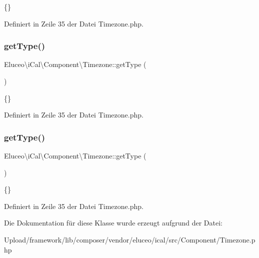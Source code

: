 \{\} 

Definiert in Zeile 35 der Datei Timezone.\+php.

\mbox{\label{class_eluceo_1_1i_cal_1_1_component_1_1_timezone_aa6dd55a9a67eec7d5a41ef9bfecda0fe}} 
\subsubsection{\texorpdfstring{get\+Type()}{getType()}\hspace{0.1cm}{\footnotesize\ttfamily [2/3]}}
{\footnotesize\ttfamily Eluceo\textbackslash{}i\+Cal\textbackslash{}\+Component\textbackslash{}\+Timezone\+::get\+Type (\begin{DoxyParamCaption}{ }\end{DoxyParamCaption})}

\{\} 

Definiert in Zeile 35 der Datei Timezone.\+php.

\mbox{\label{class_eluceo_1_1i_cal_1_1_component_1_1_timezone_aa6dd55a9a67eec7d5a41ef9bfecda0fe}} 
\subsubsection{\texorpdfstring{get\+Type()}{getType()}\hspace{0.1cm}{\footnotesize\ttfamily [3/3]}}
{\footnotesize\ttfamily Eluceo\textbackslash{}i\+Cal\textbackslash{}\+Component\textbackslash{}\+Timezone\+::get\+Type (\begin{DoxyParamCaption}{ }\end{DoxyParamCaption})}

\{\} 

Definiert in Zeile 35 der Datei Timezone.\+php.



Die Dokumentation für diese Klasse wurde erzeugt aufgrund der Datei\+:\begin{DoxyCompactItemize}
\item 
Upload/framework/lib/composer/vendor/eluceo/ical/src/\+Component/Timezone.\+php\end{DoxyCompactItemize}
